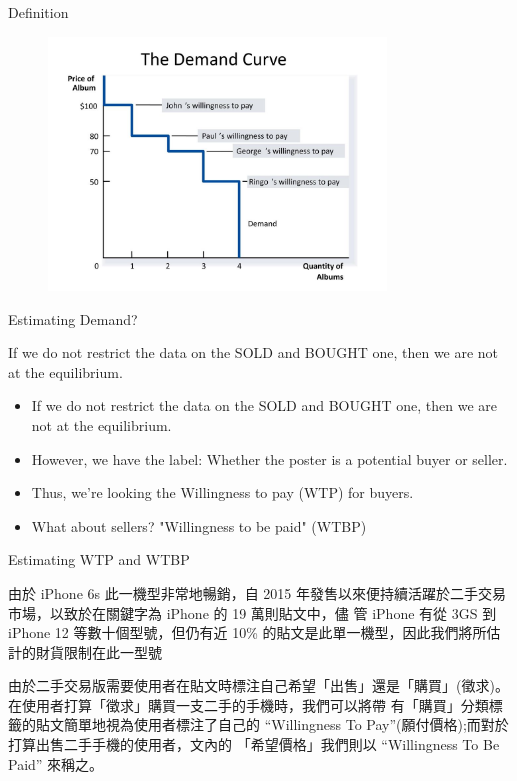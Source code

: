 \documentclass[11pt]{beamer}
\begin{document}
\begin{frame}[fragile]{Definition}

	\begin{figure}
		\begin{center}
			\includegraphics[width=0.8\textwidth]{figure/f03.png}
		\end{center}
	\end{figure}

\end{frame}


\begin{frame}[fragile]{Estimating Demand?}

If we do not restrict the data on the SOLD and BOUGHT one, then we are not at the equilibrium.
	\begin{itemize}
		\item If we do not restrict the data on the SOLD and BOUGHT one, then we are not at the equilibrium.
		\item However, we have the label: Whether the poster is a potential buyer or seller.
		\item Thus, we're looking the Willingness to pay (WTP) for buyers.
		\item What about sellers? "Willingness to be paid" (WTBP)
	\end{itemize}
\end{frame}

\begin{frame}[fragile]{Estimating WTP and WTBP}

由於 iPhone 6s 此一機型非常地暢銷，自 2015 年發售以來便持續活躍於二手交易市場，以致於在關鍵字為 iPhone 的 19 萬則貼文中，儘 管 iPhone 有從 3GS 到 iPhone 12 等數十個型號，但仍有近 10\% 的貼文是此單一機型，因此我們將所估計的財貨限制在此一型號

由於二手交易版需要使用者在貼文時標注自己希望「出售」還是「購買」(徵求)。在使用者打算「徵求」購買一支二手的手機時，我們可以將帶
有「購買」分類標籤的貼文簡單地視為使用者標注了自己的 “Willingness To Pay”(願付價格);而對於打算出售二手手機的使用者，文內的 「希望價格」我們則以 “Willingness To Be Paid” 來稱之。


\end{frame}
\end{document}

